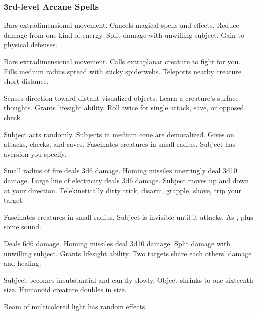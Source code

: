 \subsubsection{3rd-level Arcane Spells} 
\begin{swspelllist}
   Bars extradimensional movement.
   Cancels magical spells and effects.
   Reduce damage from one kind of energy.
   Split damage with unwilling subject.
   Gain  to physical defenses.

   Bars extradimensional movement.
   Calls extraplanar creature to fight for you.
   Fills medium radius spread with sticky spiderwebs.
   Teleports nearby creature short distance.

   Senses direction toward distant visualized objects.
   Learn a creature's surface thoughts.
   Grants lifesight ability.
   Roll twice for single attack, save, or opposed check.

   Subject acts randomly.
   Subjects in medium cone are demoralized.
   Gives  on attacks, checks, and saves.
   Fascinates creatures in small radius.
   Subject has aversion you specify.

   Small radius of fire deals 3d6 damage.
   Homing missiles unerringly deal 3d10 damage.
   Large line of electricity deals 3d6 damage.
   Subject moves up and down at your direction.
   Telekinetically dirty trick, disarm, grapple, shove, trip your target.

   Fascinates creatures in small radius.
   Subject is invisible until it attacks.
   As , plus some sound.

   Deals 6d6 damage.
   Homing missiles deal 3d10 damage.
   Split damage with unwilling subject.
   Grants lifesight ability.
   Two targets share each others' damage and healing.

   Subject becomes insubstantial and can fly slowly.
   Object shrinks to one-sixteenth size.
   Humanoid creature doubles in size.

   Beam of multicolored light has random effects.
\end{swspelllist}

